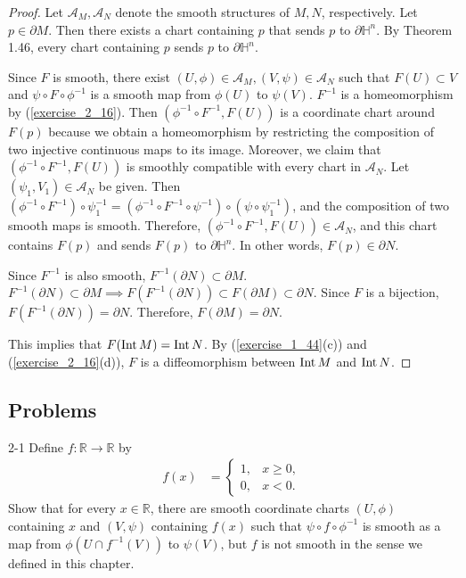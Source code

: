 \begin{proof}
  Let $\mathcal{A}_M, \mathcal{A}_N$ denote the smooth structures of $M, N$, respectively.
  Let $p \in \partial M$.
  Then there exists a chart containing $p$ that sends $p$ to $\partial \mathbb{H}^n$.
  By Theorem 1.46, every chart containing $p$ sends $p$ to $\partial \mathbb{H}^n$.

  Since $F$ is smooth, there exist $(U, \phi) \in \mathcal{A}_M, (V, \psi) \in \mathcal{A}_N$ such that $F(U) \subset V$ and $\psi \circ F \circ \phi^{-1}$ is a smooth map from $\phi(U)$ to $\psi(V)$.
  $F^{-1}$ is a homeomorphism by (\ref{exercise_2_16}).
  Then $(\phi^{-1} \circ F^{-1}, F(U))$ is a coordinate chart around $F(p)$ because we obtain a homeomorphism by restricting the composition of two injective continuous maps to its image.
  Moreover, we claim that $(\phi^{-1} \circ F^{-1}, F(U))$ is smoothly compatible with every chart in $\mathcal{A}_N$.
  Let $(\psi_1, V_1) \in \mathcal{A}_N$ be given.
  Then $(\phi^{-1} \circ F^{-1}) \circ \psi_1^{-1} = (\phi^{-1} \circ F^{-1} \circ \psi^{-1}) \circ (\psi \circ \psi_1^{-1})$, and the composition of two smooth maps is smooth.
  Therefore, $(\phi^{-1} \circ F^{-1}, F(U)) \in \mathcal{A}_N$, and this chart contains $F(p)$ and sends $F(p)$ to $\partial \mathbb{H}^n$.
  In other words, $F(p) \in \partial N$.

  Since $F^{-1}$ is also smooth, $F^{-1}(\partial N) \subset \partial M$.
  $F^{-1}(\partial N) \subset \partial M \implies F(F^{-1}(\partial N)) \subset F(\partial M) \subset \partial N$.
  Since $F$ is a bijection, $F(F^{-1}(\partial N)) = \partial N$.
  Therefore, $F(\partial M) = \partial N$.

  This implies that $F(\operatorname{Int} M) = \operatorname{Int} N$.
  By (\ref{exercise_1_44}(c)) and (\ref{exercise_2_16}(d)), $F$ is a diffeomorphism between $\operatorname{Int} M$ and $\operatorname{Int} N$.
\end{proof}

\subsection{Problems}

\begin{customprob}{2-1}
  Define $f: \mathbb{R} \rightarrow \mathbb{R}$ by
  \begin{align*}
    f(x) &= \begin{cases}
      1, & x \geq 0, \\
      0, & x < 0.
    \end{cases}
  \end{align*}
  Show that for every $x \in \mathbb{R}$, there are smooth coordinate charts $(U, \phi)$ containing $x$ and $(V, \psi)$ containing $f(x)$ such that $\psi \circ f \circ \phi^{-1}$ is smooth as a map from $\phi(U \cap f^{-1}(V))$ to $\psi(V)$, but $f$ is not smooth in the sense we defined in this chapter.
\end{customprob}

